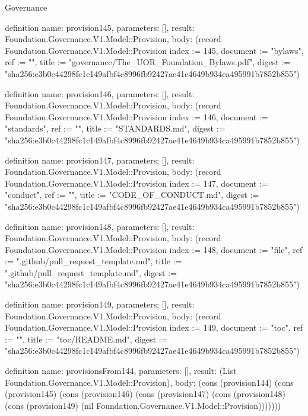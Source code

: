 \begin{lexlean}{Governance}
\begin{semanticmodule}
definition{
  name: provision145,
  parameters: [],
  result: Foundation.Governance.V1.Model::Provision,
  body: (record Foundation.Governance.V1.Model::Provision {index := 145, document := "bylaws", ref := "", title := "governance/The_UOR_Foundation_Bylaws.pdf", digest := "sha256:e3b0c44298fc1c149afbf4c8996fb92427ae41e4649b934ca495991b7852b855"})
}

definition{
  name: provision146,
  parameters: [],
  result: Foundation.Governance.V1.Model::Provision,
  body: (record Foundation.Governance.V1.Model::Provision {index := 146, document := "standards", ref := "", title := "STANDARDS.md", digest := "sha256:e3b0c44298fc1c149afbf4c8996fb92427ae41e4649b934ca495991b7852b855"})
}

definition{
  name: provision147,
  parameters: [],
  result: Foundation.Governance.V1.Model::Provision,
  body: (record Foundation.Governance.V1.Model::Provision {index := 147, document := "conduct", ref := "", title := "CODE_OF_CONDUCT.md", digest := "sha256:e3b0c44298fc1c149afbf4c8996fb92427ae41e4649b934ca495991b7852b855"})
}

definition{
  name: provision148,
  parameters: [],
  result: Foundation.Governance.V1.Model::Provision,
  body: (record Foundation.Governance.V1.Model::Provision {index := 148, document := "file", ref := ".github/pull_request_template.md", title := ".github/pull_request_template.md", digest := "sha256:e3b0c44298fc1c149afbf4c8996fb92427ae41e4649b934ca495991b7852b855"})
}

definition{
  name: provision149,
  parameters: [],
  result: Foundation.Governance.V1.Model::Provision,
  body: (record Foundation.Governance.V1.Model::Provision {index := 149, document := "toc", ref := "", title := "toc/README.md", digest := "sha256:e3b0c44298fc1c149afbf4c8996fb92427ae41e4649b934ca495991b7852b855"})
}

definition{
  name: provisionsFrom144,
  parameters: [],
  result: (List Foundation.Governance.V1.Model::Provision),
  body: (cons (provision144) (cons (provision145) (cons (provision146) (cons (provision147) (cons (provision148) (cons (provision149) (nil Foundation.Governance.V1.Model::Provision)))))))
}


\end{semanticmodule}
\end{lexlean}
